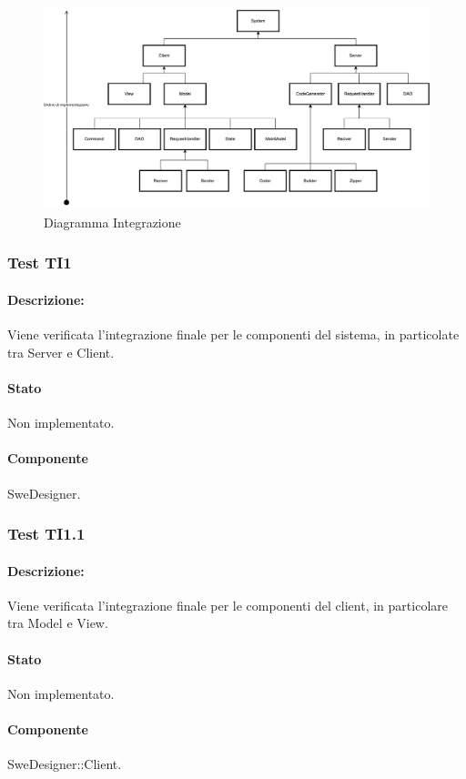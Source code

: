 \documentclass[../PianoDiQualifica.tex]{subfiles}
\begin{document}
	\begin{figure}[htbp]
		\centering
		\includegraphics[scale=0.45]{Figures/Integrazione.pdf}
		\caption{Diagramma Integrazione}\label{}
	\end{figure}
	
	
	\subsubsection{Test TI1}
	\paragraph{Descrizione:} Viene verificata l'integrazione finale per le componenti del sistema, in particolate tra Server e Client.
	\paragraph{Stato} Non implementato.
	\paragraph{Componente} SweDesigner.
	\subsubsection{Test TI1.1}
	\paragraph{Descrizione:} Viene verificata l'integrazione finale per le componenti del client, in particolare tra  Model e View.
	\paragraph{Stato} Non implementato.
	\paragraph{Componente} SweDesigner::Client.
\end{document}
